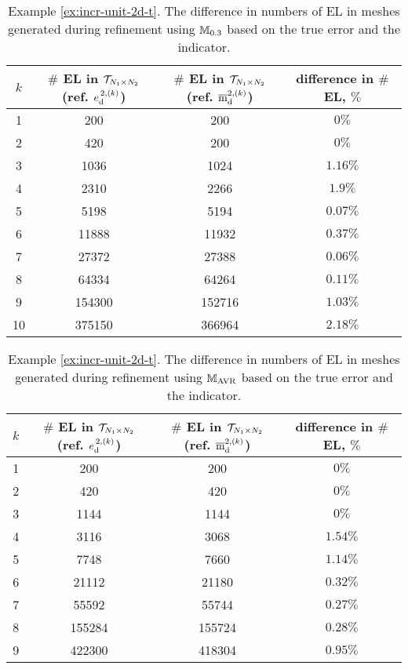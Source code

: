 \begin{example}
\clearpage

\begin{table}[!ht]
\centering
\footnotesize
\begin{tabular}{c|ccc}
\multicolumn{1}{c|}{$k$}
& $\#$ EL in $\mathcal{T}_{N_1 \times N_2}$ (ref. ${e}^{\,2, ({k})}_{\mathrm{d}}$)
& $\#$ EL in $\mathcal{T}_{N_1 \times N_2}$ (ref. $\overline{\mathrm m}^{2, ({k})}_{\mathrm{d}}$)
& difference in $\#$ EL, $\%$\\
\midrule
1 & 200 & 200 & $0 \%$ \\
2 & 420 & 200 & $0 \%$ \\
3 & 1036 & 1024 & $1.16 \%$ \\
4 & 2310 & 2266 & $1.9 \%$ \\
5 & 5198 & 5194 & $0.07 \%$ \\
6 & 11888 & 11932 & $0.37 \%$ \\
7 & 27372 & 27388 & $0.06 \%$ \\
8 & 64334 & 64264 & $0.11 \%$ \\
9 & 154300 & 152716 & $1.03 \%$ \\
10 & 375150 & 366964 & $ 2.18 \%$ \\
\end{tabular}
\caption{Example \ref{ex:incr-unit-2d-t}. The difference in numbers of EL 
in meshes generated during refinement using ${\mathbb M}_{0.3}$ 
based on the true error and the indicator.}
\label{tab:differences-in-EL-bulk-0-3}
\end{table}
%
\begin{table}[!ht]
\centering
\footnotesize
\begin{tabular}{c|ccc}
\multicolumn{1}{c|}{$k$}
& $\#$ EL in $\mathcal{T}_{N_1 \times N_2}$ (ref. ${e}^{\,2, ({k})}_{\mathrm{d}}$)
& $\#$ EL in $\mathcal{T}_{N_1 \times N_2}$ (ref. $\overline{\mathrm m}^{2, ({k})}_{\mathrm{d}}$)  
& difference in $\#$ EL, $\%$\\
\midrule
1 & 200 & 200 & $0 \%$ \\
2 & 420 & 420 & $0 \%$ \\
3 & 1144 & 1144 & $0 \%$ \\
4 & 3116 & 3068 & $1.54 \%$ \\
5 & 7748 & 7660 & $1.14 \%$ \\
6 & 21112 & 21180 & $0.32 \%$ \\
7 & 55592 & 55744 & $ 0.27 \%$ \\
8 & 155284 & 155724 & $0.28 \%$ \\
9 & 422300 & 418304 & $ 0.95 \%$ \\
\end{tabular}
\caption{Example \ref{ex:incr-unit-2d-t}. The difference in numbers of EL 
in meshes generated during refinement using ${\mathbb M}_{\rm AVR}$ 
based on the true error and the indicator.}
\label{tab:differences-in-EL-average}
\end{table}


\end{example}
